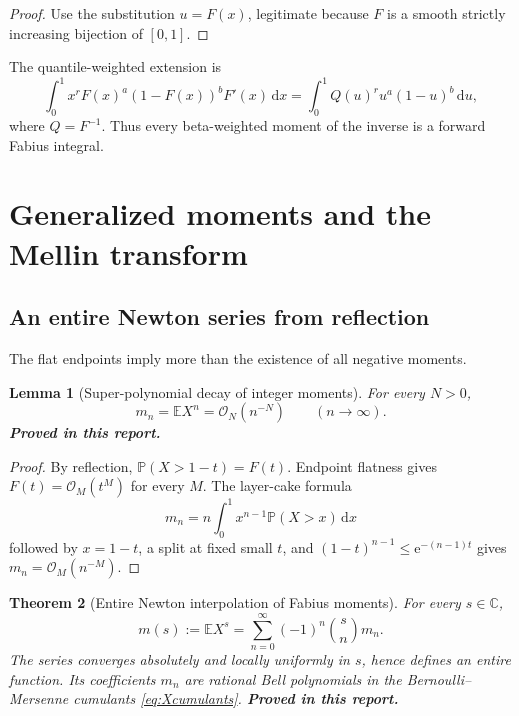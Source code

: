 \documentclass[11pt,oneside]{article}
\numberwithin{equation}{section}
\newtheorem{theorem}{Theorem}[section]
\newtheorem{lemma}[theorem]{Lemma}
\theoremstyle{definition}
\theoremstyle{remark}
\newcommand{\C}{\mathbb C}
\newcommand{\e}{\mathrm e}
\newcommand{\dd}{\,\mathrm d}
\newcommand{\E}{\mathbb E}
\newcommand{\Prob}{\mathbb P}
\newcommand{\bigO}{\mathcal O}
\newcommand{\QF}{Q}
\newcommand{\statusproved}{\textcolor{proofgreen}{\textbf{Proved in this report.}}}
\begin{document}
\begin{proof}
Use the substitution \(u=F(x)\), legitimate because \(F\) is a smooth strictly
increasing bijection of \([0,1]\).
\end{proof}

The quantile-weighted extension is
\begin{equation}
 \int_0^1x^rF(x)^a(1-F(x))^bF'(x)\dd x
 =\int_0^1\QF(u)^r u^a(1-u)^b\dd u,
 \label{eq:weighted-beta-quantile}
\end{equation}
where \(\QF=F^{-1}\).  Thus every beta-weighted moment of the inverse is a
forward Fabius integral.

\section{Generalized moments and the Mellin transform}
\label{sec:mellin}

\subsection{An entire Newton series from reflection}

The flat endpoints imply more than the existence of all negative moments.

\begin{lemma}[Super-polynomial decay of integer moments]
\label{lem:moment-decay}
For every \(N>0\),
\begin{equation}
 m_n=\E X^n=\bigO_N(n^{-N})\qquad(n\to\infty).
 \label{eq:moment-superpoly}
\end{equation}
\statusproved
\end{lemma}

\begin{proof}
By reflection, \(\Prob(X>1-t)=F(t)\).  Endpoint flatness gives
\(F(t)=\bigO_M(t^M)\) for every \(M\).  The layer-cake formula
\[
 m_n=n\int_0^1x^{n-1}\Prob(X>x)\dd x
\]
followed by \(x=1-t\), a split at fixed small \(t\), and
\((1-t)^{n-1}\le\e^{-(n-1)t}\) gives \(m_n=\bigO_M(n^{-M})\).
\end{proof}

\begin{theorem}[Entire Newton interpolation of Fabius moments]
\label{thm:moment-newton}
For every \(s\in\C\),
\begin{equation}
 \boxed{m(s):=\E X^s
 =\sum_{n=0}^{\infty}(-1)^n\binom{s}{n}m_n.}
 \label{eq:moment-newton}
\end{equation}
The series converges absolutely and locally uniformly in \(s\), hence defines
an entire function.  Its coefficients \(m_n\) are rational Bell polynomials in
the Bernoulli--Mersenne cumulants \eqref{eq:Xcumulants}.  \statusproved
\end{theorem}
\end{document}
